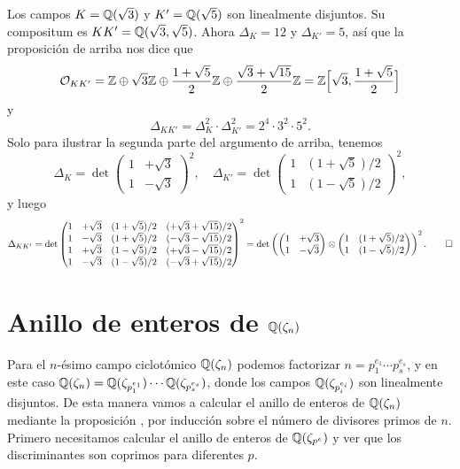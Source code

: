 \begin{ejemplo}
  Los campos $K = \mathbb{Q} (\sqrt{3})$ y $K' = \mathbb{Q} (\sqrt{5})$ son linealmente
  disjuntos. Su compositum es $K K' = \mathbb{Q} (\sqrt{3},\sqrt{5})$. Ahora
  $\Delta_K = 12$ y $\Delta_{K'} = 5$, así que la proposición de arriba nos dice
  que
  \[ \mathcal{O}_{K K'} =
     \mathbb{Z} \oplus \sqrt{3} \mathbb{Z} \oplus \frac{1+\sqrt{5}}{2} \mathbb{Z} \oplus \frac{\sqrt{3}+\sqrt{15}}{2} \mathbb{Z} =
     \mathbb{Z} \Bigl[\sqrt{3}, \frac{1 + \sqrt{5}}{2}\Bigr] \]
  y
  $$\Delta_{K K'} = \Delta_K^2\cdot \Delta_{K'}^2 = 2^4\cdot 3^2\cdot 5^2.$$
  Solo para ilustrar la segunda parte del argumento de arriba, tenemos
  \[ \Delta_K = \det \begin{pmatrix}
    1 & +\sqrt{3} \\
    1 & -\sqrt{3}
    \end{pmatrix}^2, \quad \Delta_{K'} = \det \begin{pmatrix}
    1 & (1+\sqrt{5})/2 \\
    1 & (1-\sqrt{5})/2
    \end{pmatrix}^2, \]
  y luego
  \[ \Delta_{K K'} = \det \begin{pmatrix}
    1 & +\sqrt{3} & (1+\sqrt{5})/2 & (+\sqrt{3}+\sqrt{15})/2 \\
    1 & -\sqrt{3} & (1+\sqrt{5})/2 & (-\sqrt{3}-\sqrt{15})/2 \\
    1 & +\sqrt{3} & (1-\sqrt{5})/2 & (+\sqrt{3}-\sqrt{15})/2 \\
    1 & -\sqrt{3} & (1-\sqrt{5})/2 & (-\sqrt{3}+\sqrt{15})/2 \\
  \end{pmatrix}^2 = \det \left(\begin{pmatrix}
    1 & +\sqrt{3} \\
    1 & -\sqrt{3}
  \end{pmatrix}\otimes \begin{pmatrix}
    1 & (1+\sqrt{5})/2 \\
    1 & (1-\sqrt{5})/2
  \end{pmatrix}\right)^2. \qedhere \]
\end{ejemplo}


\section{Anillo de enteros de \texorpdfstring{$\mathbb{Q} (\zeta_n)$}{ℚ(ζₙ)}}

Para el $n$-ésimo campo ciclotómico $\mathbb{Q} (\zeta_n)$ podemos factorizar
$n = p_1^{e_1} \cdots p_s^{e_s}$,
y en este caso
$\mathbb{Q} (\zeta_n) = \mathbb{Q} (\zeta_{p_1^{e_1}}) \cdots \mathbb{Q} (\zeta_{p_s^{e_s}})$,
donde los campos $\mathbb{Q} (\zeta_{p_i^{e_i}})$ son linealmente disjuntos. De esta
manera vamos a calcular el anillo de enteros de $\mathbb{Q} (\zeta_n)$ mediante
la proposición \label{prop:OK-del-compositum}, por inducción sobre el número de
divisores primos de $n$. Primero necesitamos calcular el anillo de enteros de
$\mathbb{Q} (\zeta_{p^e})$ y ver que los discriminantes son coprimos para diferentes
$p$.


